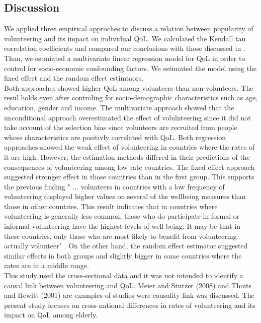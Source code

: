 \documentclass[10pt, letterpaper]{article}
\begin{document}
\begin{spacing}{1.4}
 
\section{Discussion}

We applied three  empirical approches to discuss a relation between popularity of volunteering and its impact on individual QoL. We calculated the Kendall tau correlation coefficients and compared  our conclusions with those discussed in \citet{haski09}. Than, we estmiated a multivariate linear regression model  for QoL in order to control for socio-economic confounding factors. We estimated the model  using the fixed effect and the random effect estimtaors.\\

Both approaches showed higher QoL among volunteers than non-volunteers. The resul holds even after controling for socio-demographic characteristics such as age, education, gender and income. The multivariate approach showed that the unconditional approach overestimated the effect of volulnteering since it did not take account of the selection bias since volunteers are recruited from people whose characteristics are positivly correlated with QoL. Both regression approaches showed the weak effect of volunteering in countries where the rates of it  are high. However, the estimation methods differed in their predictions of the consequences of volunteering among low rate countries. The fixed effect approach suggested stronger effect in those countries than in the first group.
This supports the previous finding " ... volunteers in countries with a low frequency of volunteering displayed higher values on several of the wellbeing measures than those in other countries. This result indicates that in countries where volunteering is generally less common, those who do participate in formal or
informal volunteering have the highest levels of well-being. It may be that in these countries, only those who are most likely to benefit from volunteering actually volunteer" \citet{plagnol10}. On the other hand, the random effect estimator  suggested similar effects in both groups and slightly bigger in some countries where the rates are in a middle range. \\

This study used the cross-sectional data and it was not intended to identify a causal link between volunteering and QoL. Meier and Stutzer (2008) and Thoits and Hewitt (2001) are examples of studies were causality link was discussed. The present study focuses on cross-national differences in rates of volunteering and its impact on QoL among elderly. \\


\end{spacing}
\end{document}
